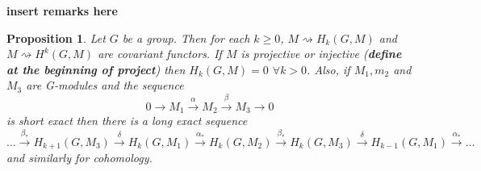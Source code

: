 \documentclass[a4paper,10pt]{article}
\newtheorem{prop}[thm]{Proposition}
\begin{document}
\textbf{insert remarks here}

\begin{prop}
Let $G$ be a group. Then for each $k\geq 0$, $M\rightsquigarrow H_{k}(G,M)$ and $M\rightsquigarrow H^{k}(G,M)$ are covariant functors.
\newline If $M$ is projective or injective (\textbf{define at the beginning of project}) then $H_{k}(G,M)=0$ $\forall k>0$.
\newline Also, if $M_{1},m_{2}$ and $M_{3}$ are G-modules and the sequence $$0{\rightarrow} M_{1}\stackrel{\alpha}{\rightarrow} M_{2} \stackrel{\beta}{\rightarrow} M_{3} \rightarrow 0$$ is short exact then there is a long exact sequence $$\ldots \stackrel{\beta_{*}}{\rightarrow} H_{k+1}(G,M_{3})\stackrel{\delta}{\rightarrow} H_{k}(G,M_{1})\stackrel{\alpha_{*}}{\rightarrow} H_{k}(G,M_{2}) \stackrel{\beta_{*}}{\rightarrow} H_{k}(G,M_{3})\stackrel{\delta}{\rightarrow} H_{k-1}(G,M_{1}) \stackrel{\alpha_{*}}{\rightarrow} \ldots$$
and similarly for cohomology.
\end{prop}
\end{document}
